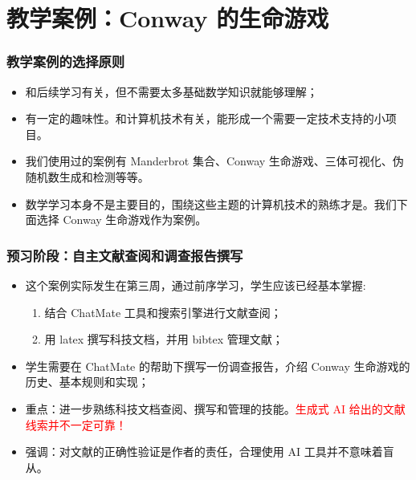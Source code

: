 \documentclass{beamer}
\begin{document}
\section{教学案例：Conway 的生命游戏}

\begin{frame}
    \frametitle{教学案例的选择原则}
    \begin{itemize} \small
        \item 和后续学习有关，但不需要太多基础数学知识就能够理解；
        \item 有一定的趣味性。和计算机技术有关，能形成一个需要一定技术支持的小项目。
        \item 我们使用过的案例有 Manderbrot 集合、Conway 生命游戏、三体可视化、伪随机数生成和检测等等。
        \item 数学学习本身不是主要目的，围绕这些主题的计算机技术的熟练才是。我们下面选择 Conway 生命游戏作为案例。
    \end{itemize}
    \begin{center}
    \end{center}
\end{frame}

\begin{frame}
    \frametitle{预习阶段：自主文献查阅和调查报告撰写}
    \begin{itemize}
        \item<1-> 这个案例实际发生在第三周，通过前序学习，学生应该已经基本掌握:
            \begin{enumerate} \small
                \item 结合 ChatMate 工具和搜索引擎进行文献查阅；
                \item 用 latex 撰写科技文档，并用 bibtex 管理文献；
            \end{enumerate}
        \item<1-> 学生需要在 ChatMate 的帮助下撰写一份调查报告，介绍 Conway 生命游戏的历史、基本规则和实现；
        \item<2-> 重点：进一步熟练科技文档查阅、撰写和管理的技能。\textcolor{red}{生成式 AI 给出的文献线索并不一定可靠！} 
        \item<3-> 强调：对文献的正确性验证是作者的责任，合理使用 AI 工具并不意味着盲从。
    \end{itemize}
\end{frame}
\end{document}
